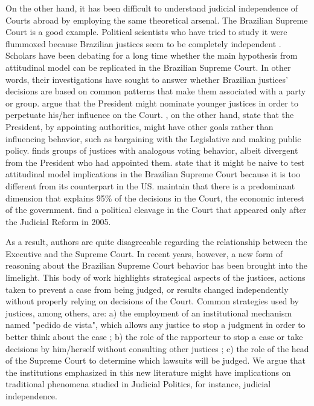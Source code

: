 \documentclass[12pt, a4paper]{article}
\begin{document}
On the other hand, it has been difficult to understand judicial independence of Courts abroad by employing the same theoretical arsenal. The Brazilian Supreme Court is a good example. Political scientists who have
tried to study it were flummoxed because Brazilian justices seem to be completely 
independent \citep{rios2006institutional, taylor2008judging}. Scholars have been debating for a long time whether the main hypothesis from attitudinal model can be replicated in the Brazilian Supreme Court. In other words, their investigations have sought to answer whether Brazilian justices' decisions are based on common patterns that make them associated with a party or group.
\citet{prado2009democracia} argue that the President might nominate younger justices
in order to perpetuate his/her
influence on the Court. \citet{arguelhes2010indicaccoes}, on the other hand, state that the 
President, by appointing authorities, might have other goals rather than influencing behavior, such as bargaining with the Legislative and making public policy. \citet{oliveira2012decision} finds groups of justices with analogous voting behavior, albeit divergent from the President who had appointed them.
\citet{molhano2013preferencias} state that it might be naive to test attitudinal model implications in the Brazilian Supreme Court because it is too different from its counterpart in the US. \citet{ferreira2014judges} maintain that there is a predominant dimension that explains 95\% of the decisions in the Court, the economic interest of the government. \citet{desposato2014power} find a political cleavage in the Court that appeared only after the Judicial Reform in 2005.

As a result, authors are
quite disagreeable regarding the relationship between the Executive and the Supreme Court. In recent years, however, a new form of reasoning about the Brazilian Supreme Court behavior has been brought into the limelight. This body of work highlights strategical aspects of the justices, actions taken to prevent a case from being judged, or results changed independently without properly relying  on decisions of the Court. Common strategies used by justices, among others, are: a) the employment of
an institutional mechanism named "pedido de vista", which
allows any justice to stop a judgment in order to better think about the case \citep{arguelhes2016supremo, arguelhes2017timing}; b) the role of the rapporteur to stop a case or take decisions by him/herself
without consulting other justices \citep{arguelhes2016supremo,hartmann2016relator}; c) the role of the head of the Supreme Court to determine which lawsuits will be judged. We argue that the institutions emphasized in this new literature might have implications on traditional phenomena studied in Judicial Politics, for instance, judicial independence.
\end{document}
